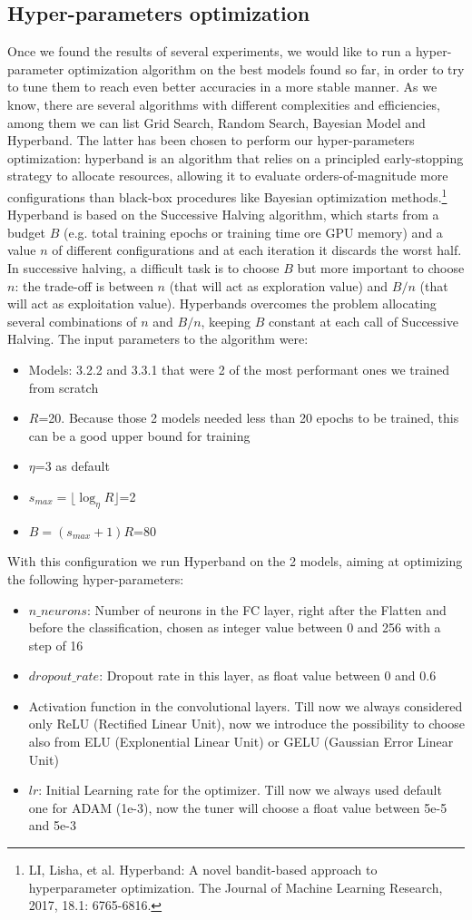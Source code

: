 \subsection{Hyper-parameters optimization}
Once we found the results of several experiments, we would like to run a hyper-parameter optimization algorithm on the best models found so far, in order to try to tune them to reach even better accuracies in a more stable manner. As we know, there are several algorithms with different complexities and efficiencies, among them we can list Grid Search, Random Search, Bayesian Model and Hyperband. The latter has been chosen to perform our hyper-parameters optimization: hyperband is an algorithm that relies on a principled early-stopping strategy to allocate resources, allowing it to evaluate orders-of-magnitude more configurations than black-box procedures like Bayesian optimization methods.\footnote{LI, Lisha, et al. Hyperband: A novel bandit-based approach to hyperparameter optimization. The Journal of Machine Learning Research, 2017, 18.1: 6765-6816.}
Hyperband is based on the Successive Halving algorithm, which starts from a budget $B$ (e.g. total training epochs or training time ore GPU memory) and a value $n$ of different configurations and at each iteration it discards the worst half. In successive halving, a difficult task is to choose $B$ but more important to choose $n$: the trade-off is between $n$ (that will act as exploration value) and $B/n$ (that will act as exploitation value).
Hyperbands overcomes the problem allocating several combinations of $n$ and $B/n$, keeping $B$ constant at each call of Successive Halving.
The input parameters to the algorithm were:
\begin{itemize}
\item Models: 3.2.2 and 3.3.1 that were 2 of the most performant ones we trained from scratch
\item $R$=20. Because those 2 models needed less than 20 epochs to be trained, this can be a good upper bound for training
\item $\eta$=3 as default
\item $s_{max}=\lfloor \log_{\eta} R \rfloor$=2
\item $B=(s_{max}+1)R$=80
\end{itemize}
With this configuration we run Hyperband on the 2 models, aiming at optimizing the following hyper-parameters:
\begin{itemize}
\item $n\_neurons$: Number of neurons in the FC layer, right after the Flatten and before the classification, chosen as integer value between 0 and 256 with a step of 16
\item $dropout\_rate$: Dropout rate in this layer, as float value between 0 and 0.6
\item Activation function in the convolutional layers. Till now we always considered only ReLU (Rectified Linear Unit), now we introduce the possibility to choose also from ELU (Explonential Linear Unit) or GELU (Gaussian Error Linear Unit)
\item $lr$: Initial Learning rate for the optimizer. Till now we always used default one for ADAM (1e-3), now the tuner will choose a float value between 5e-5 and 5e-3
\end{itemize}

